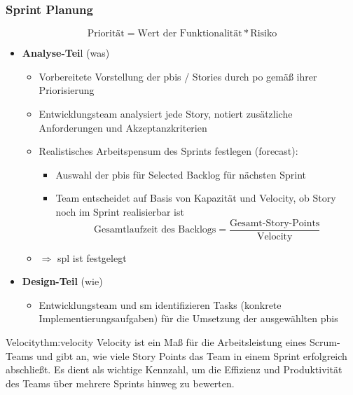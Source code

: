 \documentclass[main.tex]{subfiles}
\begin{document}
\subsubsection*{Sprint Planung}
\begin{equation} \label{eq:prio}
    \text{Priorität} = \text{Wert der Funktionalität} * \text{Risiko}
\end{equation}
\begin{itemize}
    \item \textbf{Analyse-Tei}l (was)
    \begin{itemize}
        \item Vorbereitete Vorstellung der \glspl{pbi} / Stories durch \gls{po} gemäß ihrer Priorisierung
        \item Entwicklungsteam analysiert jede Story, notiert zusätzliche Anforderungen und Akzeptanzkriterien
        \item Realistisches Arbeitspensum des Sprints festlegen (\gls{forecast}): 
        \begin{itemize}
            \item Auswahl der \glspl{pbi} für Selected Backlog für nächsten Sprint
            \item Team entscheidet auf Basis von Kapazität und \gls{Velocity}, ob Story noch im Sprint realisierbar ist
            \begin{equation}
                \text{Gesamtlaufzeit des Backlogs} = \frac{\text{Gesamt-Story-Points}}{\text{Velocity}}
            \end{equation}
        \end{itemize}
         \item[] $\Rightarrow$ \gls{spl} ist festgelegt
    \end{itemize}
    \item \textbf{Design-Teil} (wie)
    \begin{itemize}
        \item Entwicklungsteam und \gls{sm} identifizieren Tasks (konkrete Implementierungsaufgaben) für die Umsetzung der ausgewählten \glspl{pbi}
    \end{itemize}
\end{itemize}
\begin{myTheorem}{Velocity}{thm:velocity}
\Gls{Velocity} ist ein Maß für die Arbeitsleistung eines Scrum-Teams und gibt an, wie viele Story Points das Team in einem Sprint erfolgreich abschließt. Es dient als wichtige Kennzahl, um die Effizienz und Produktivität des Teams über mehrere Sprints hinweg zu bewerten.
\end{myTheorem}
\end{document}

